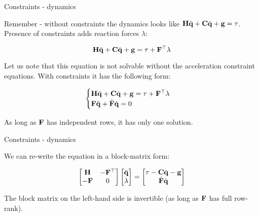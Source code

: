 \documentclass{beamer}
\begin{document}
\begin{frame}{Constraints - dynamics}
	\begin{flushleft}
		
		Remember - without constraints the dynamics looks like $\mathbf{H} \ddot{\mathbf{q}} + \mathbf{C} \dot{\mathbf{q}} + \mathbf{g} = \tau$. Presence of constraints adds reaction forces $\lambda$:
		
		\begin{equation}
			\mathbf{H} \ddot{\mathbf{q}} + \mathbf{C} \dot{\mathbf{q}} + \mathbf{g} = \tau + \mathbf{F}^\top \lambda
		\end{equation}
		
		Let us note that this equation is not solvable without the acceleration constraint equations. With constraints it has the following form:
		
		\begin{equation}
			\begin{cases}
				\mathbf{H} \ddot{\mathbf{q}} + \mathbf{C} \dot{\mathbf{q}} + \mathbf{g} = \tau + \mathbf{F}^\top \lambda \\
				\mathbf{F}\ddot{\mathbf{q}} + \dot{\mathbf{F}} \dot{\mathbf{q}} = 0
			\end{cases}
		\end{equation}		
		
		As long as $\mathbf{F}$ has independent rows, it has only one solution.
		
	\end{flushleft}
\end{frame}




\begin{frame}{Constraints - dynamics}
	\begin{flushleft}
		
		We can re-write the equation in a block-matrix form:
		
		\begin{equation}
			\begin{bmatrix}
				\mathbf{H} & -\mathbf{F}^\top \\
			   -\mathbf{F} & 0
			\end{bmatrix}
\begin{bmatrix}
	 \ddot{\mathbf{q}} \\
	 \lambda
\end{bmatrix}		
=
\begin{bmatrix}
	\tau - \mathbf{C} \dot{\mathbf{q}}- \mathbf{g} \\
	\dot{\mathbf{F}} \dot{\mathbf{q}}
\end{bmatrix}		
		\end{equation}		
		
		The block matrix on the left-hand side is invertible (as long as $\mathbf{F}$ has full row-rank).
		
	\end{flushleft}
\end{frame}
\end{document}
